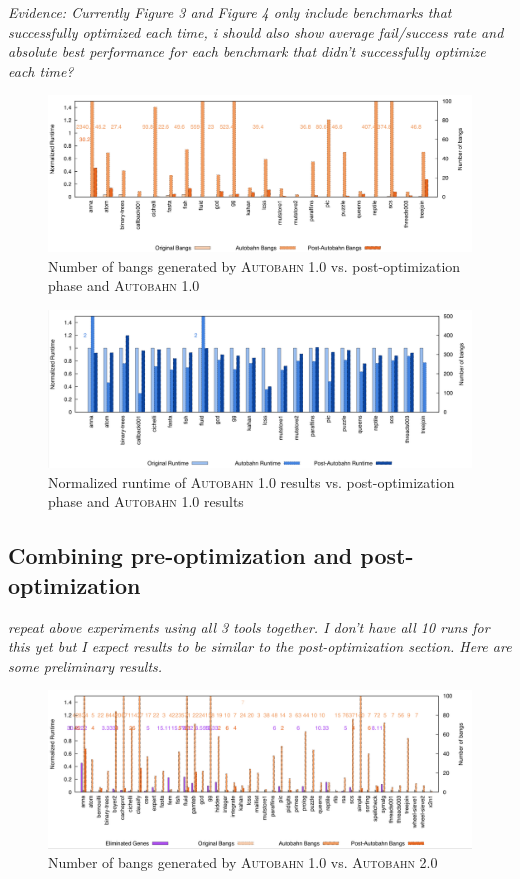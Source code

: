\documentclass[format=sigplan]{acmart}
\newcommand{\Ao}[0]{\textsc{Autobahn 1.0}}
\newcommand{\At}[0]{\textsc{Autobahn 2.0}}
\newcommand{\preopt}[0]{pre-optimization}
\newcommand{\postopt}[0]{post-optimization}
\begin{document}
\textit{Evidence: Currently Figure 3 and Figure 4 only include benchmarks that successfully optimized each time, i should also show average fail/success rate and absolute best performance for each benchmark that didn't successfully optimize each time?}

\begin{figure}
\includegraphics[width=\textwidth]{autPost1}
\caption{Number of bangs generated by \Ao{} vs. \postopt{} phase and \Ao{}}
\end{figure}

\begin{figure}
\includegraphics[width=\textwidth]{autPost2}
\caption{Normalized runtime of \Ao{} results vs. \postopt{} phase and \Ao{} results}
\end{figure}

\subsection{Combining \preopt{} and \postopt{}}

\textit{repeat above experiments using all 3 tools together. I don't have all 10 runs for this yet but I expect results to be similar to the \postopt{} section. Here are some preliminary results.}

\begin{figure}
\includegraphics[width=\textwidth]{pap}
\caption{Number of bangs generated by \Ao{} vs. \At{}}
\end{figure}
\end{document}
